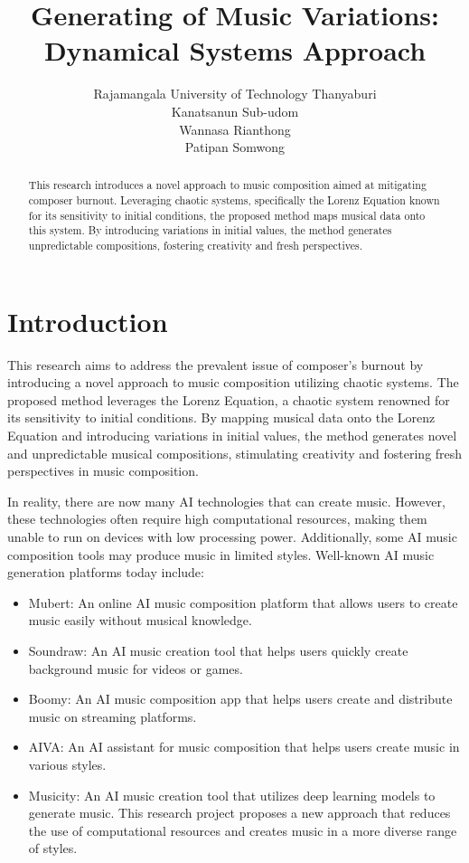\documentclass[11pt]{article}
\title{Generating of Music Variations: Dynamical Systems Approach}
\author{Rajamangala University of Technology Thanyaburi\\Kanatsanun Sub-udom\\Wannasa Rianthong\\Patipan Somwong}
\begin{document}
\maketitle
\begin{abstract}
This research introduces a novel approach to music composition aimed at mitigating composer burnout. Leveraging chaotic systems, specifically the Lorenz Equation known for its sensitivity to initial conditions, the proposed method maps musical data onto this system. By introducing variations in initial values, the method generates unpredictable compositions, fostering creativity and fresh perspectives. 
\end{abstract}

\section{Introduction}
This research aims to address the prevalent issue of composer's burnout by introducing a novel approach to music composition utilizing chaotic systems. The proposed method leverages the Lorenz Equation, a chaotic system renowned for its sensitivity to initial conditions. By mapping musical data onto the Lorenz Equation and introducing variations in initial values, the method generates novel and unpredictable musical compositions, stimulating creativity and fostering fresh perspectives in music composition.

In reality, there are now many AI technologies that can create music. However, these technologies often require high computational resources, making them unable to run on devices with low processing power. Additionally, some AI music composition tools may produce music in limited styles. Well-known AI music generation platforms \cite{bonnici_music_2021} today include:

\begin{itemize}
\item Mubert: An online AI music composition platform that allows users to create music easily without musical knowledge.
\item Soundraw: An AI music creation tool that helps users quickly create background music for videos or games.
\item Boomy: An AI music composition app that helps users create and distribute music on streaming platforms.
\item AIVA: An AI assistant for music composition that helps users create music in various styles.
\item Musicity: An AI music creation tool that utilizes deep learning models to generate music. This research project proposes a new approach that reduces the use of computational resources and creates music in a more diverse range of styles.
\end{itemize}
\end{document}
